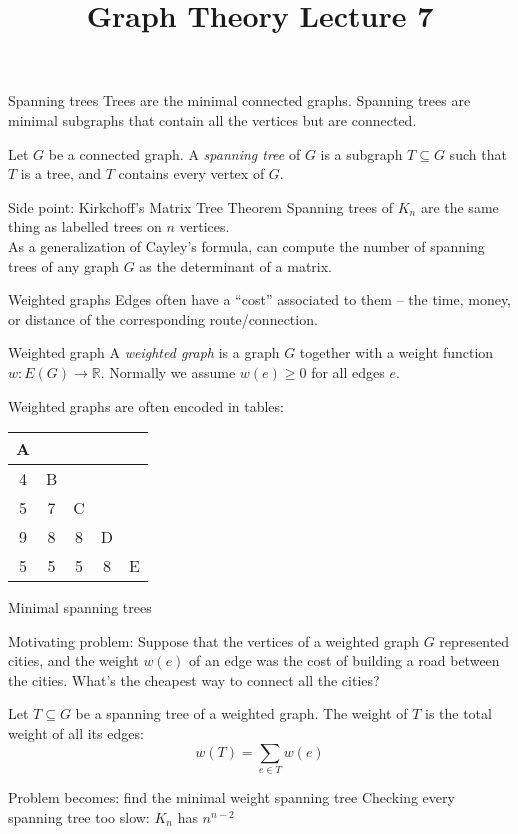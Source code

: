 \documentclass{beamer}
\title{Graph Theory Lecture 7}
\begin{document}
\begin{frame}{Spanning trees}
Trees are the minimal connected graphs.  Spanning trees are minimal subgraphs that contain all the vertices but are connected.
  \begin{definition}Let $G$ be a connected graph.  A \emph{spanning tree} of $G$ is a subgraph $T\subseteq G$ such that $T$ is a tree, and $T$ contains every vertex of $G$.
    \end{definition}
  \begin{block}{Side point: Kirkchoff's Matrix Tree Theorem}
    Spanning trees of $K_n$ are the same thing as labelled trees on $n$ vertices. \\
As a generalization of Cayley's formula, can compute the number of spanning trees of any graph $G$ as the determinant of a matrix.
    \end{block}

\end{frame}

\begin{frame}{Weighted graphs}
Edges often have a ``cost'' associated to them -- the time, money, or distance of the corresponding route/connection.

  \begin{definition}{Weighted graph}
    A \emph{weighted graph} is a graph $G$ together with a weight function $w:E(G)\to \mathbb{R}.$  Normally we assume $w(e)\geq 0$ for all edges $e$.
  \end{definition}

  Weighted graphs are often encoded in tables: 
\begin{center}
  \begin{tabular}{c|c|c|c|c}
    A &   &   &   &   \\ \hline
    4 & B &   &   &   \\ \hline
    5 & 7 & C &   &   \\ \hline
    9 & 8 & 8 & D &   \\ \hline
    5 & 5 & 5 & 8 & E \\
    \end{tabular}
  \end{center}
  \end{frame}

\begin{frame}{Minimal spanning trees}
\begin{block}{Motivating problem:}
  Suppose that the vertices of a weighted graph $G$ represented cities, and the weight $w(e)$ of an edge was the cost of building a road between the cities.  What's the cheapest way to connect all the cities?
\end{block}
  \begin{definition} Let $T\subseteq G$ be a spanning tree of a weighted graph.  The weight of $T$ is the total weight of all its edges:
    $$w(T)=\sum_{e\in T}w(e)$$
 \end{definition}
  \begin{block}{Problem becomes: find the minimal weight spanning tree}
    Checking every spanning tree too slow: $K_n$ has $n^{n-2}$
    \end{block}
\end{frame}
\end{document}
